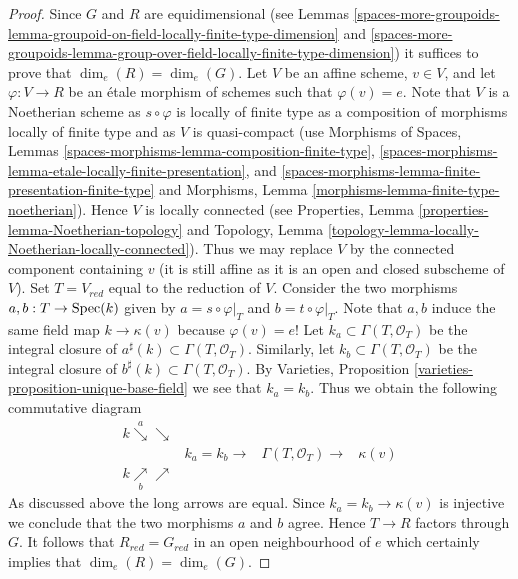 \begin{proof}
Since $G$ and $R$ are equidimensional (see
Lemmas \ref{spaces-more-groupoids-lemma-groupoid-on-field-locally-finite-type-dimension} and
\ref{spaces-more-groupoids-lemma-group-over-field-locally-finite-type-dimension})
it suffices to prove that $\dim_e(R) = \dim_e(G)$. Let $V$ be an affine scheme,
$v \in V$, and let $\varphi : V \to R$ be an \'etale morphism of schemes
such that $\varphi(v) = e$. Note that $V$ is a Noetherian scheme as
$s \circ \varphi$ is locally of finite type as a composition of morphisms
locally of finite type and as $V$ is quasi-compact (use
Morphisms of Spaces, Lemmas
\ref{spaces-morphisms-lemma-composition-finite-type},
\ref{spaces-morphisms-lemma-etale-locally-finite-presentation}, and
\ref{spaces-morphisms-lemma-finite-presentation-finite-type}
and
Morphisms, Lemma \ref{morphisms-lemma-finite-type-noetherian}).
Hence $V$ is locally connected (see
Properties, Lemma \ref{properties-lemma-Noetherian-topology}
and
Topology, Lemma \ref{topology-lemma-locally-Noetherian-locally-connected}).
Thus we may replace $V$ by the connected component containing $v$ (it
is still affine as it is an open and closed subscheme of $V$).
Set $T = V_{red}$ equal to the reduction of $V$. Consider the two
morphisms $a, b : T \to \operatorname{Spec}(k)$ given by
$a = s \circ \varphi|_T$ and $b = t \circ \varphi|_T$. Note that
$a, b$ induce the same field map $k \to \kappa(v)$ because $\varphi(v) = e$!
Let $k_a \subset \Gamma(T, \mathcal{O}_T)$ be the integral closure of
$a^\sharp(k) \subset \Gamma(T, \mathcal{O}_T)$. Similarly, let
$k_b \subset \Gamma(T, \mathcal{O}_T)$ be the integral closure of
$b^\sharp(k) \subset \Gamma(T, \mathcal{O}_T)$. By
Varieties, Proposition \ref{varieties-proposition-unique-base-field}
we see that $k_a = k_b$. Thus we obtain the following commutative diagram
$$
\begin{array}{cccc}k \overset{a}{\searrow}\searrow &  &  &  \\  & k_a = k_b \longrightarrow & \Gamma(T, \mathcal{O}_T) \longrightarrow & \kappa(v) \\ k \underset{b}{\nearrow}\nearrow &  &  & \end{array}
$$
As discussed above the long arrows are equal.
Since $k_a = k_b \to \kappa(v)$ is injective we conclude that
the two morphisms $a$ and $b$ agree. Hence $T \to R$ factors through $G$.
It follows that $R_{red} = G_{red}$ in an open neighbourhood of $e$
which certainly implies that $\dim_e(R) = \dim_e(G)$.
\end{proof}

